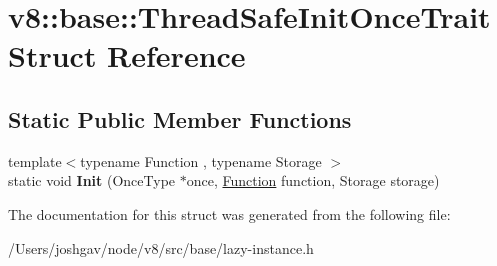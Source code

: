 \hypertarget{structv8_1_1base_1_1_thread_safe_init_once_trait}{}\section{v8\+:\+:base\+:\+:Thread\+Safe\+Init\+Once\+Trait Struct Reference}
\label{structv8_1_1base_1_1_thread_safe_init_once_trait}
\subsection*{Static Public Member Functions}
\begin{DoxyCompactItemize}
\item 
{\footnotesize template$<$typename Function , typename Storage $>$ }\\static void {\bfseries Init} (Once\+Type $\ast$once, \hyperlink{classv8_1_1_function}{Function} function, Storage storage)\hypertarget{structv8_1_1base_1_1_thread_safe_init_once_trait_ac14ff68670250c50c27a2841abf6ad34}{}\label{structv8_1_1base_1_1_thread_safe_init_once_trait_ac14ff68670250c50c27a2841abf6ad34}

\end{DoxyCompactItemize}


The documentation for this struct was generated from the following file\+:\begin{DoxyCompactItemize}
\item 
/\+Users/joshgav/node/v8/src/base/lazy-\/instance.\+h\end{DoxyCompactItemize}
